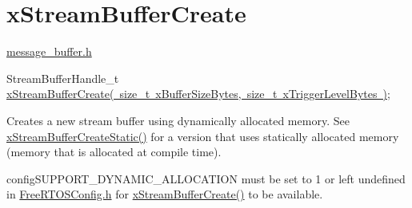 \hypertarget{group__x_stream_buffer_create}{}\section{x\+Stream\+Buffer\+Create}
\label{group__x_stream_buffer_create}
\mbox{\hyperlink{message__buffer_8h}{message\+\_\+buffer.\+h}}


\begin{DoxyPre}
StreamBufferHandle\_t \mbox{\hyperlink{stream__buffer_8h_a39aa4dd8b83e2df7ded291f863fb5fed}{xStreamBufferCreate( size\_t xBufferSizeBytes, size\_t xTriggerLevelBytes )}};
\end{DoxyPre}


Creates a new stream buffer using dynamically allocated memory. See \mbox{\hyperlink{stream__buffer_8h_a3c248575ac1b83801db605b32a118f77}{x\+Stream\+Buffer\+Create\+Static()}} for a version that uses statically allocated memory (memory that is allocated at compile time).

config\+S\+U\+P\+P\+O\+R\+T\+\_\+\+D\+Y\+N\+A\+M\+I\+C\+\_\+\+A\+L\+L\+O\+C\+A\+T\+I\+ON must be set to 1 or left undefined in \mbox{\hyperlink{_free_r_t_o_s_config_8h}{Free\+R\+T\+O\+S\+Config.\+h}} for \mbox{\hyperlink{stream__buffer_8h_a39aa4dd8b83e2df7ded291f863fb5fed}{x\+Stream\+Buffer\+Create()}} to be available.


